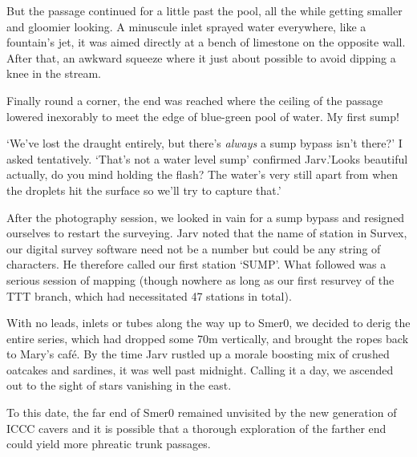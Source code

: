 But the passage continued for a little past the pool, all the while getting smaller and gloomier looking. A minuscule inlet sprayed water everywhere, like a fountain’s jet, it was aimed directly at a bench of limestone on the opposite wall. After that, an awkward squeeze where it just about possible to avoid dipping a knee in the stream. 

Finally round a corner, the end was reached where the ceiling of the passage lowered inexorably to meet the edge of blue-green pool of water. My first sump!

‘We’ve lost the draught entirely, but there’s \emph{always} a sump bypass isn’t there?’ I asked tentatively.
‘That’s not a water level sump’ confirmed Jarv.’Looks beautiful actually, do you mind holding the flash? The water’s very still apart from when the droplets hit the surface so we’ll try to capture that.’

After the photography session, we looked in vain for a sump bypass and resigned ourselves to restart the surveying. Jarv noted that the name of station in Survex, our digital survey software need not be a number but could be any string of characters. He therefore called our first station ‘SUMP’. What followed was a serious session of mapping (though nowhere as long as our first resurvey of the TTT branch, which had necessitated 47 stations in total). 

With no leads, inlets or tubes along the way up to Smer0, we decided to derig the entire series, which had dropped some 70m vertically, and brought the ropes back to Mary’s café. By the time Jarv rustled up a morale boosting mix of crushed oatcakes and sardines, it was well past midnight. Calling it a day, we ascended out to the sight of stars vanishing in the east. 

To this date, the far end of Smer0 remained unvisited by the new generation of ICCC cavers and it is possible that a thorough exploration of the farther end could yield more phreatic trunk passages.

